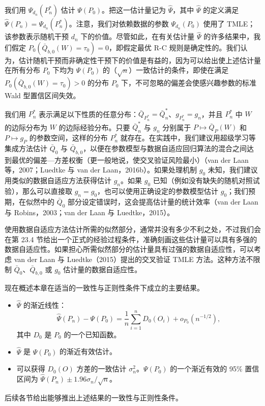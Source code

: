 我们用 $\Psi_{d_n}(P_n^*)$ 估计 $\Psi(P_0)$。把这一估计量记为 $\hat\Psi$，其中 $\hat\Psi$ 的定义满足 $\hat\Psi(P_n)=\Psi_{d_n}(P_n^*)$。注意，我们对依赖数据的参数 $\Psi_{d_n}(P_0)$ 使用了 TMLE；该参数表示随机干预 $d_n$ 下的价值。尽管如此，在有关估计量 $\hat\Psi$ 的许多结果中，我们假定 $P_0(\bar Q_{b,0}(W)=\tau_0)=0$，即假定最优 R-C 规则是确定性的。我们认为，估计随机干预而非确定性干预下的价值是有益的，因为可以给出使上述估计量在所有分布 $P_0$ 下均为 $\Psi(P_0)$ 的（$\sqrt n$）一致估计的条件，即使在满足 $P_0(\bar Q_{b,0}(W)=\tau_0)>0$ 的分布 $P_0$ 下，不可忽略的偏差会使感兴趣参数的标准 Wald 型置信区间失效。

我们用 $P_n^*$ 表示满足以下性质的任意分布：$\bar Q_{P_n^*}=\bar Q_n^*$、$g_{P_n^*}=g_n$，并且 $P_n^*$ 中 $W$ 的边际分布为 $W$ 的边际经验分布。只要 $\bar Q_n^*$ 与 $g_n$ 分别属于 $P\mapsto\bar Q_P(W)$ 和 $P\mapsto g_P$ 的参数空间，这样的分布 $P_n^*$ 就存在。在实践中，我们建议用超级学习等集成方法估计 $\bar Q_0$ 与 $\bar Q_{b,0}$，以便在参数模型与数据自适应回归算法的混合之间达到最优的偏差—方差权衡（更一般地说，使交叉验证风险最小）（van der Laan 等，2007；Luedtke 与 van der Laan，2016b）。如果处理机制 $g_0$ 未知，我们建议用类似的数据自适应方法获得估计 $g_n$。如果 $g_0$ 已知（例如没有缺失的随机对照试验），那么可以直接取 $g_n=g_0$，也可以使用正确设定的参数模型估计 $g_0$；我们预期，在似然中的 $\bar Q_0$ 部分设定错误时，这会提高估计量的统计效率（van der Laan 与 Robins，2003；van der Laan 与 Luedtke，2015）。

使用数据自适应方法估计所需的似然部分，通常并没有多少不利之处，不过我们会在第 23.4 节给出一个正式的经验过程条件，准确刻画这些估计量可以具有多强的数据自适应性。如果担心所需似然部分的估计量具有过强的数据自适应性，可以考虑 van der Laan 与 Luedtke（2015）提出的交叉验证 TMLE 方法。这种方法不限制 $\bar Q_0$、$\bar Q_{b,0}$ 或 $g_0$ 估计量的数据自适应性。

现在概述本章在适当的一致性与正则性条件下成立的主要结果。
\begin{itemize}
\item $\hat\Psi$ 的渐近线性：
\[
 \hat\Psi(P_n)-\Psi(P_0)=\frac1n\sum_{i=1}^nD_0(O_i)+o_{P_0}(n^{-1/2}),
\]
其中 $D_0$ 是 $P_0$ 的一个已知函数。
\item $\hat\Psi$ 是 $\Psi(P_0)$ 的渐近有效估计。
\item 可以获得 $D_0(O)$ 方差的一致估计 $\sigma_n^2$。$\Psi(P_0)$ 的一个渐近有效的 95\% 置信区间为 $\hat\Psi(P_n)\pm1.96\sigma_n/\sqrt n$。
\end{itemize}
后续各节给出能够推出上述结果的一致性与正则性条件。
